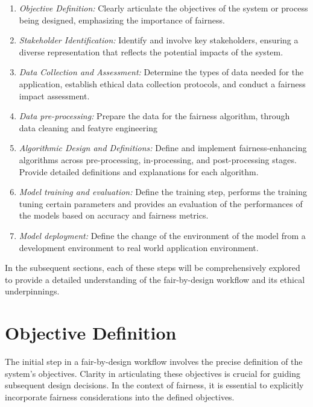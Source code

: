\documentclass[12pt,a4paper,openright,twoside]{book}
\begin{document}
\begin{enumerate}

    \item \emph{Objective Definition:} Clearly articulate the objectives of the system or process being designed, emphasizing the importance of fairness.

    \item \emph{Stakeholder Identification:} Identify and involve key stakeholders, ensuring a diverse representation that reflects the potential impacts of the system.

    \item \emph{Data Collection and Assessment:} Determine the types of data needed for the application, establish ethical data collection protocols, and conduct a fairness impact assessment.

    \item \emph{Data pre-processing:} Prepare the data for the fairness algorithm, through data cleaning and featyre engineering
    
    \item \emph{Algorithmic Design and Definitions:} Define and implement fairness-enhancing algorithms across pre-processing, in-processing, and post-processing stages. Provide detailed definitions and explanations for each algorithm.

    \item \emph{Model training and evaluation:} Define the training step, performs the training tuning certain parameters and provides an evaluation of the performances of the models based on accuracy and fairness metrics.

    \item \emph{Model deployment:} Define the change of the environment of the model from a development environment to real world application environment.

\end{enumerate}

In the subsequent sections, each of these steps will be comprehensively explored to provide a detailed understanding of the fair-by-design workflow and its ethical underpinnings.

\section{Objective Definition}

The initial step in a fair-by-design workflow involves the precise definition of the system's objectives. Clarity in articulating these objectives is crucial for guiding subsequent design decisions. In the context of fairness, it is essential to explicitly incorporate fairness considerations into the defined objectives.
\end{document}
